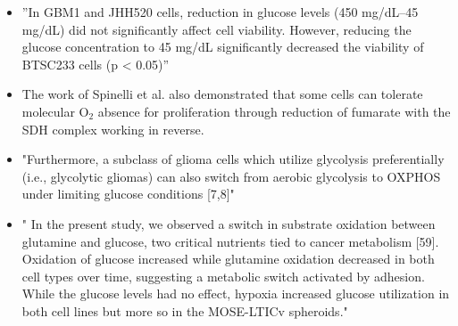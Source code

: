 \documentclass[11pt,a4paper]{article}
\begin{document}
\begin{itemize}
 \item ”In GBM1 and JHH520 cells, reduction in glucose levels (450 mg/dL–45 mg/dL) did not significantly affect cell viability. However, reducing the glucose concentration to
45 mg/dL significantly decreased the viability of BTSC233 cells (p < 0.05)” \cite{Yusuf2022}
\item The work of Spinelli et al. also demonstrated that some cells can tolerate molecular O$_{2}$ absence for proliferation through reduction of fumarate with the SDH complex working in reverse. \cite{Spinelli2021}
\item "Furthermore, a subclass of glioma cells which utilize glycolysis preferentially (i.e., glycolytic gliomas) can also switch from aerobic glycolysis to OXPHOS under limiting glucose
conditions [7,8]"\cite{Jose2010}
\item " In the present study, we observed a switch in substrate oxidation between glutamine and glucose, two critical nutrients tied to cancer metabolism [59]. Oxidation of glucose increased while glutamine oxidation decreased in both cell types over time, suggesting a metabolic switch activated by adhesion. While the glucose levels had no effect, hypoxia increased glucose utilization in both cell lines but more so in the MOSE-LTICv spheroids." \cite{Compton2022}
\end{itemize}
\end{document}
